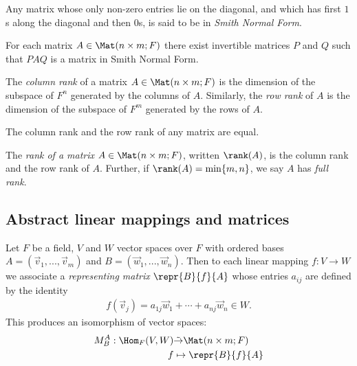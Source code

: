 \documentclass{article}
\begin{document}
\begin{definition}
	Any matrix whose only non-zero entries lie on the diagonal, and which has
	first $1$s along the diagonal and then $0$s, is said to be in \emph{Smith Normal Form}.
\end{definition}

\begin{theorem}[Notes 2.2.5]
	For each matrix $A\in\Mat(n\times m;F)$ there exist invertible matrices $P$
	and $Q$ such that $PAQ$ is a matrix in Smith Normal Form.
\end{theorem}

\begin{definition}
	The \emph{column rank} of a matrix $A\in\Mat(n\times m;F)$ is the dimension of
	the subspace of $F^n$ generated by the columns of $A$. Similarly, the \emph{row
		rank} of $A$ is the dimension of the subspace of $F^m$ generated by the rows
	of $A$.
\end{definition}

\begin{theorem}[Notes 2.2.8]
	The column rank and the row rank of any matrix are equal.
\end{theorem}

\begin{definition}
	The \emph{rank of a matrix} $A\in\Mat(n\times m;F)$, written $\rank(A)$, is the column rank and the
	row rank of $A$. Further, if $\rank(A) = \min\{m,n\}$, we say $A$ has
	\emph{full rank}.
\end{definition}

\subsection{Abstract linear mappings and matrices}

\begin{theorem}[Notes 2.3.1]
	Let $F$ be a field, $V$ and $W$ vector spaces over $F$ with ordered bases $A=(\vec v_1,...,\vec v_m)$
	and $B=(\vec w_1,...,\vec w_n)$. Then to each linear mapping $f:V\to W$ we associate a
	\emph{representing matrix} $\repr{B}{f}{A}$ whose entries $a_{ij}$ are defined by the
	identity
	\begin{align*}
		f(\vec v_j) = a_{1j}\vec w_1 + \cdots + a_{nj}\vec w_n \in W.
	\end{align*}
	This produces an isomorphism of vector spaces:
	\begin{align*}
		M^A_B:\Hom_F(V,W) & \tilde\to \Mat(n\times m; F) \\
		f                 & \mapsto \repr{B}{f}{A}
	\end{align*}
\end{theorem}
\end{document}
